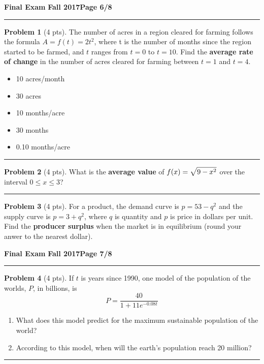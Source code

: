 \documentclass[12pt]{article}
\makeatletter
\theoremstyle{definition}
\newtheorem{problem}{Problem}
\newcommand*{\radiobutton}{%
  \@ifstar{\@radiobutton0}{\@radiobutton1}%
}
\newcommand*{\@radiobutton}[1]{%
  \begin{tikzpicture}
    \pgfmathsetlengthmacro\radius{height("X")/2}
    \draw[radius=\radius] circle;
    \ifcase#1 \fill[radius=.6*\radius] circle;\fi
  \end{tikzpicture}%
}
\makeatother
\begin{document}
\hfill{\large\bf Final Exam}\hfill{\large\bf
  Fall 2017}\hfill{\large\bf Page 6/8}\hrule

\bigskip 

\begin{problem}[4 pts]
The number of acres in a region cleared for farming follows the formula $A = f (t) = 2t^2$, where t is the number of months since the region started to be farmed, and $t$ ranges from $t = 0$ to $t = 10$. Find the \textbf{average rate of change} in the number of acres cleared for farming between $t = 1$ and $t = 4$. 
\begin{itemize}
\item[\radiobutton] 10 acres/month
\item[\radiobutton] 30 acres
\item[\radiobutton] 10 months/acre
\item[\radiobutton] 30 months
\item[\radiobutton] 0.10 months/acre
\end{itemize}
\end{problem}

\hrule

\begin{problem}[4 pts]
What is the \textbf{average value} of $f(x) = \displaystyle{\sqrt{\vphantom{\lvert} 9-x^2}}$ over the interval $0 \leq x \leq 3$? 
\end{problem}
\vspace{4cm}
\hrule

\begin{problem}[4 pts]
For a product, the demand curve is $p=53-q^2$ and the supply curve is $p=3+q^2$, where $q$ is quantity and $p$ is price in dollars per unit. Find the \textbf{producer surplus} when the market is in equilibrium (round your anwer to the nearest dollar).
\end{problem}

\newpage

\hfill{\large\bf Final Exam}\hfill{\large\bf
  Fall 2017}\hfill{\large\bf Page 7/8}\hrule

\bigskip

\begin{problem}[4 pts]
If $t$ is years since 1990, one model of the population of the worlds, $P$, in billions, is
\begin{equation*} P = \frac{40}{1+11e^{-0.08t}} \end{equation*}
\begin{enumerate}
  \item What does this model predict for the maximum sustainable population of the world?
  \vspace{1cm}
  \item According to this model, when will the earth's population reach 20 million?
\end{enumerate}

\vspace{1cm}
\end{problem}
\hrule
\end{document}
